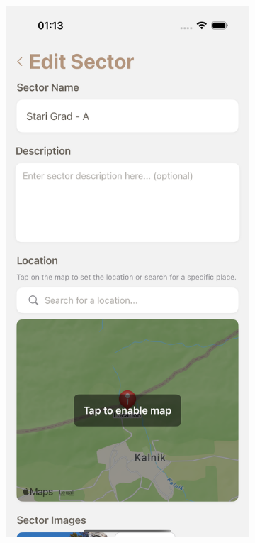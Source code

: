\begin{figure}[H]
    \centering
    \begin{subfigure}[b]{0.38\textwidth}
        \centering
        \includegraphics[width=\textwidth]{images/implementacija/editing-options/edit-sector.png}

\end{subfigure}
\end{figure}
